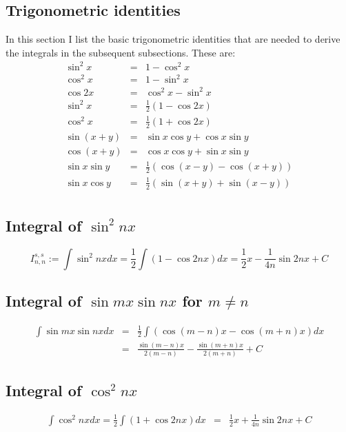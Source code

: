 \documentclass[12pt]{article}
\begin{document}
\subsection{Trigonometric identities}
In this section I list the basic trigonometric identities that are needed to derive the integrals in the subsequent subsections. These are:
\begin{eqnarray*}
\sin^2 x &=& 1 - \cos^2 x \\
\cos^2 x &=& 1 - \sin^2 x \\
\cos 2x &=& \cos^2 x - \sin^2 x \\
\sin^2 x &=& \frac{1}{2} \left(1 - \cos 2x \right) \\
\cos^2 x &=& \frac{1}{2} \left(  1 + \cos 2x  \right) \\ 
\sin (x+y) &=& \sin x \cos y + \cos x \sin y \\
\cos (x+y) &=& \cos x \cos y + \sin x \sin y \\
\sin x \sin y &=& \frac{1}{2} \left( \cos (x-y) - \cos (x+y) \right) \\
\sin x \cos y &=& \frac{1}{2} \left( \sin(x+y) + \sin(x-y)  \right) \\
\end{eqnarray*}


\subsection{Integral of $\sin^2 nx$}
\begin{equation*}
I^{s, s}_{n, n} := \int \sin^2 nx dx = \frac{1}{2} \int \left(1 - \cos 2nx \right) dx = \frac{1}{2}x - \frac{1}{4n} \sin 2nx + C
\end{equation*}

\subsection{Integral of $ \sin mx \sin nx $ for $m \neq n$}
\begin{eqnarray*}
\int \sin mx \sin nx dx &=& \frac{1}{2} \int \left( \cos (m-n)x - \cos (m+n)x \right) dx \\
				&=& \frac{\sin(m-n)x}{2(m-n)} - \frac{\sin(m+n)x}{2(m+n)}  + C
\end{eqnarray*}


\subsection{Integral of $ \cos^2 nx $}
\begin{eqnarray*}
\int \cos^2 nx dx = \frac{1}{2} \int  \left(  1 + \cos 2nx  \right) dx 
				&=& \frac{1}{2} x + \frac{1}{4n} \sin 2nx + C
\end{eqnarray*}
\end{document}
